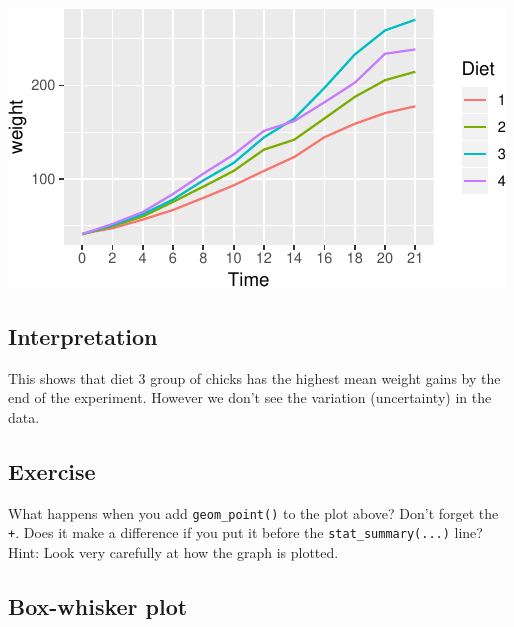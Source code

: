 \documentclass[a4paper,9pt,twocolumn,twoside,printwatermark=false]{pinp}
\begin{document}
\begin{Shaded}
\begin{Highlighting}[]
               \OperatorTok{+}
\StringTok{  }\NormalTok{(}\NormalTok{, }\NormalTok{) }
\end{Highlighting}
\end{Shaded}

\begin{center}\includegraphics{Getting-Started-in-R_files/figure-latex/meanlinesPlot-1} \end{center}

\subsection{Interpretation}\label{interpretation-3}

This shows that diet 3 group of chicks has the highest mean weight gains
by the end of the experiment. However we don't see the variation
(uncertainty) in the data.

\subsection{Exercise}\label{exercise-5}

What happens when you add \texttt{geom\_point()} to the plot above?
Don't forget the \texttt{+}. Does it make a difference if you put it
before the \texttt{stat\_summary(...)} line? Hint: Look very carefully
at how the graph is plotted.

\subsection{Box-whisker plot}\label{box-whisker-plot}
\end{document}
